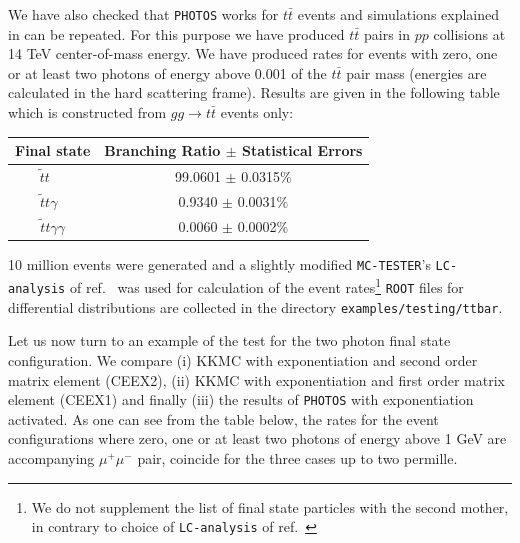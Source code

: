 \documentclass[]{Photos_interface_design}
\begin{document}
We have also checked that {\tt PHOTOS} works for $t \bar t$ events and simulations explained in \cite{RichterWas:1993ta} can be repeated.
For this purpose we have produced $t \bar t$ pairs in $pp$ collisions at 
14 TeV center-of-mass energy. We have produced rates for events with zero, one or
at least two photons of energy above 0.001 of the $t \bar t$ pair mass
(energies are calculated in  the hard scattering frame).
Results are given in the following table which is constructed from  
$gg \to t \bar t$ events only:

\vspace{0.3cm} 
\begin{center}
{ \begin{tabular}{c c} 
\toprule 
Final state &  Branching Ratio  $\pm$ Statistical Errors \\  
\midrule
{$ \widetilde{t} t \; \;\; \;$}  &  {99.0601 $\pm$ 0.0315\%}  \\ 
 {$  \widetilde{t} t \gamma \;\;$} &   { 0.9340 $\pm$  0.0031\%}   \\ 
{$  \widetilde{t} t \gamma \gamma$}  &  { 0.0060 $\pm$  0.0002\%}  \\ 
\bottomrule
\end{tabular} 
}  
\end{center} 

10 million events were generated and a slightly modified 
{\tt MC-TESTER}'s {\tt LC-analysis} of ref.~\cite{Golonka:2002rz}
was used for calculation of the event rates\footnote{  We do not supplement the list of 
final state particles with the second mother, in contrary to choice of {\tt LC-analysis} of  ref.~\cite{Golonka:2002rz} }
{\tt ROOT} files for differential distributions are 
collected in the directory {\tt examples/testing/ttbar}. 

Let us now turn to an example of the test for the two photon final state configuration.
We compare (i) KKMC \cite{kkcpc:1999} with exponentiation and second order matrix element (CEEX2), (ii) KKMC with exponentiation and first order matrix element (CEEX1)
and finally (iii) the results of {\tt PHOTOS} with exponentiation activated. As one can see from the table below, the rates for the event configurations 
where zero, one or at least two photons of energy above 1 GeV are accompanying $\mu^+\mu^-$ pair,
coincide for the three cases up to two permille. 
\end{document}
